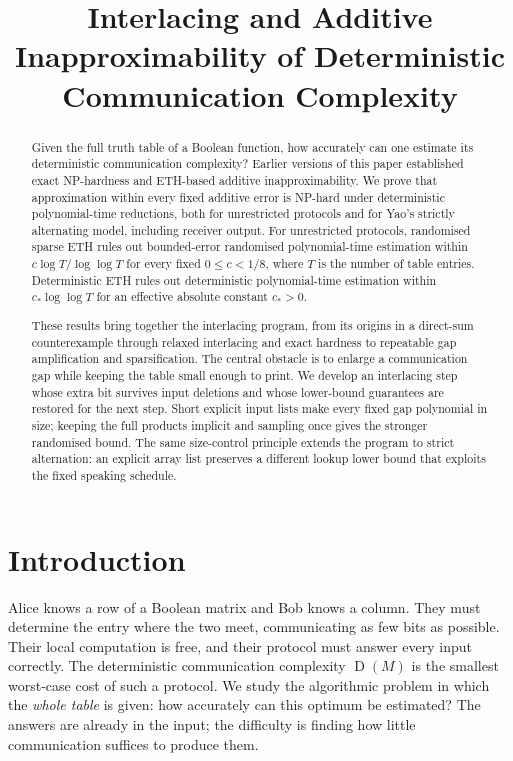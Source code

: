 \documentclass[11pt]{article} \usepackage[utf8]{inputenc}
\theoremstyle{plain} \newtheorem{theorem}{Theorem}[section]
\theoremstyle{definition} \newaliascnt{definition}{theorem}
\newcommand{\D}{\operatorname{D}}
\begin{document}
\title{Interlacing and Additive Inapproximability of Deterministic Communication Complexity}
\author{}
\date{}
\maketitle

\begin{abstract}
Given the full truth table of a Boolean function, how accurately can one
estimate its deterministic communication complexity? Earlier versions of
this paper established exact NP-hardness and ETH-based additive
inapproximability. We prove that approximation within every fixed additive
error is NP-hard under deterministic polynomial-time reductions, both for
unrestricted protocols and for Yao's strictly alternating model, including
receiver output. For unrestricted protocols, randomised sparse ETH rules
out bounded-error randomised polynomial-time estimation within
$c\log T/\log\log T$ for every fixed $0\le c<1/8$, where $T$ is the number
of table entries. Deterministic ETH rules out deterministic polynomial-time
estimation within $c_*\log\log T$ for an effective absolute constant $c_*>0$.

These results bring together the interlacing program, from its origins in
a direct-sum counterexample through relaxed interlacing and exact hardness
to repeatable gap amplification and sparsification. The central obstacle is
to enlarge a communication gap while keeping the table small enough to
print. We develop an interlacing step whose extra bit survives input
deletions and whose lower-bound guarantees are restored for the next step.
Short explicit input lists make every fixed gap polynomial in size;
keeping the full products implicit and sampling once gives the stronger
randomised bound. The same size-control principle extends the program to
strict alternation: an explicit array list preserves a different lookup
lower bound that exploits the fixed speaking schedule.
\end{abstract}

\section{Introduction}
\label{sec:intro}

Alice knows a row of a Boolean matrix and Bob knows a column. They must
determine the entry where the two meet, communicating as few bits as possible.
Their local computation is free, and their protocol must answer every input
correctly. The deterministic communication complexity $\D(M)$ is the smallest
worst-case cost of such a protocol. We study the algorithmic problem in which
the \emph{whole table} is given: how accurately can this optimum be estimated?
The answers are already in the input; the difficulty is finding how little
communication suffices to produce them.
\end{document}
